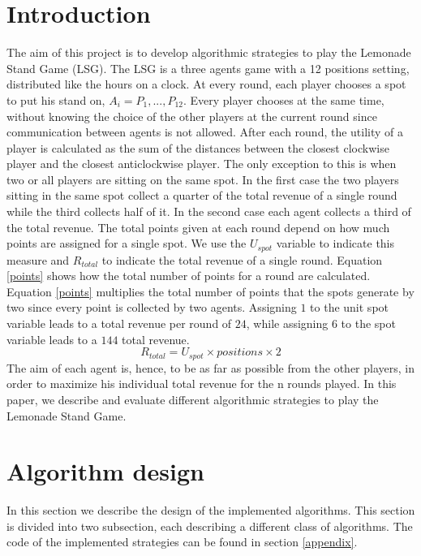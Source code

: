\documentclass[runningheads]{llncs}
\begin{document}
\section{Introduction}
The aim of this project is to develop algorithmic strategies to play
the Lemonade Stand Game (LSG). The LSG is a three agents game with a
12 positions setting, distributed like the hours on a clock.  At every
round, each player chooses a spot to put his stand on, $A_i = {P_1, ...,
  P_{12}}$. Every player chooses at the same time, without knowing the
choice of the other players at the current round since communication
between agents is not allowed. After each round, the utility of a
player is calculated as the sum of the distances between the closest
clockwise player and the closest anticlockwise player. The only
exception to this is when two or all players are sitting on the same
spot. In the first case the two players sitting in the same spot
collect a quarter of the total revenue of a single round while the
third collects half of it. In the second case each agent collects a
third of the total revenue. The total points given at each round depend
on how much points are assigned for a single spot. We use the 
$U_{spot}$ variable to indicate this measure and $R_{total}$ to
indicate the total revenue of a single round. Equation \ref{points} shows
how the total number of points for a round are calculated.
Equation \ref{points} multiplies the total number of points that the
spots generate by two since every point is collected by two
agents. Assigning $1$ to the unit spot variable leads to a total
revenue per round of $24$, while assigning $6$ to the spot variable
leads to a $144$ total revenue.
\begin{equation}\label{points}
R_{total} = U_{spot} \times positions \times 2
\end{equation}
The aim of each agent is, hence, to be as far as possible from the
other players, in order to maximize his individual total revenue for the n rounds
played. In this paper, we describe and evaluate different algorithmic
strategies to play the Lemonade Stand Game.

\section{Algorithm design}
In this section we describe the design of the implemented
algorithms. This section is divided into two subsection, each
describing a different class of algorithms. The code of the
implemented strategies can be found in section \ref{appendix}.
\end{document}
